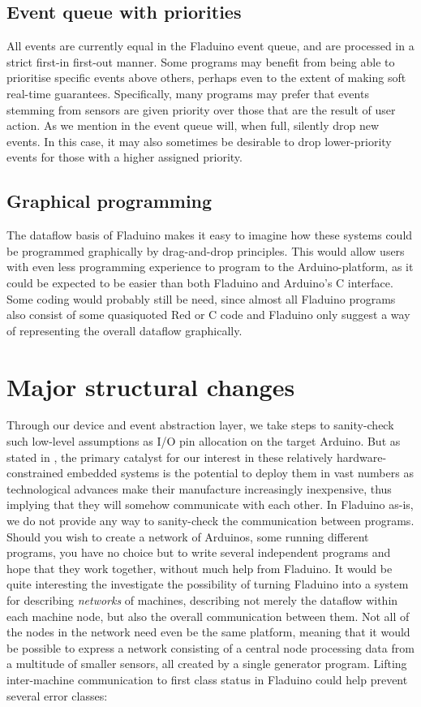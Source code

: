 \documentclass[a4paper, oneside, final]{memoir}
\let\Fref\undefined
\begin{document}
\subsection{Event queue with priorities}
\label{sec:fladuino-event-queue}

All events are currently equal in the Fladuino event queue, and are
processed in a strict first-in first-out manner.  Some programs may
benefit from being able to prioritise specific events above others,
perhaps even to the extent of making soft real-time guarantees.
Specifically, many programs may prefer that events stemming from
sensors are given priority over those that are the result of user
action.  As we mention in \Fref{sec:event_queue} the event queue will,
when full, silently drop new events.  In this case, it may also
sometimes be desirable to drop lower-priority events for those with a
higher assigned priority.

\subsection{Graphical programming}
The dataflow basis of Fladuino makes it easy to imagine how these
systems could be programmed graphically by drag-and-drop
principles. This would allow users with even less programming
experience to program to the Arduino-platform, as it could be expected
to be easier than both Fladuino and Arduino's C interface. Some coding
would probably still be need, since almost all Fladuino programs also
consist of some quasiquoted Red or C code and Fladuino only suggest a
way of representing the overall dataflow graphically. 


\section{Major structural changes}

Through our device and event abstraction layer, we take steps to
sanity-check such low-level assumptions as I/O pin allocation on the
target Arduino.  But as stated in \Fref{sec:motivation}, the primary
catalyst for our interest in these relatively hardware-constrained
embedded systems is the potential to deploy them in vast numbers as
technological advances make their manufacture increasingly
inexpensive, thus implying that they will somehow communicate with
each other.  In Fladuino as-is, we do not provide any way to
sanity-check the communication between programs.  Should you wish to
create a network of Arduinos, some running different programs, you
have no choice but to write several independent programs and hope that
they work together, without much help from Fladuino.  It would be
quite interesting the investigate the possibility of turning Fladuino
into a system for describing \textit{networks} of machines, describing
not merely the dataflow within each machine node, but also the overall
communication between them.  Not all of the nodes in the network need
even be the same platform, meaning that it would be possible to
express a network consisting of a central node processing data from a
multitude of smaller sensors, all created by a single generator
program.  Lifting inter-machine communication to first class status in
Fladuino could help prevent several error classes:
\end{document}
